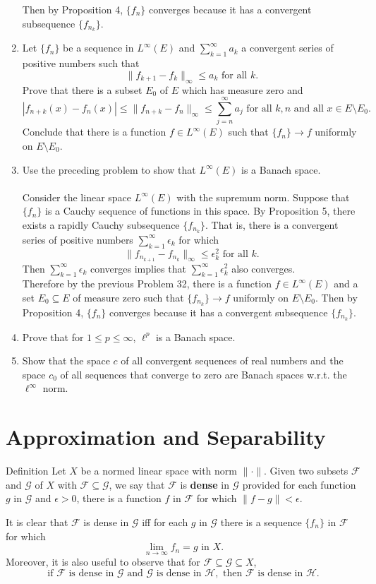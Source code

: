 \begin{enumerate}
	Then by Proposition 4, $\{f_n\}$ converges because it has a convergent subsequence $\{f_{n_k}\}$. 
	\item Let $\{f_n\}$ be a sequence in $L^\infty(E)$ and $\sum_{k=1}^\infty a_k$ a convergent series of positive numbers such that
	\[
		\|f_{k+1}-f_k\|_{\infty}\le a_k\text{ for all }k.
	\]
	Prove that there is a subset $E_0$ of $E$ which has measure zero and 
	\[
		|f_{n+k}(x)-f_n(x)|\le\|f_{n+k}-f_n\|_{\infty}\le\sum_{j=n}^\infty a_j\text{ for all }k,n\text{ and all }x\in E\setminus E_0.
	\]
	Conclude that there is a function $f\in L^\infty(E)$ such that $\{f_n\}\to f$ uniformly on $E\setminus E_0$.
	\item Use the preceding problem to show that $L^\infty(E)$ is a Banach space.\\
	\\Consider the linear space $L^\infty(E)$ with the supremum norm. 
	Suppose that $\{f_n\}$ is a Cauchy sequence of functions in this space.
	By Proposition 5, there exists a rapidly Cauchy subsequence $\{f_{n_k}\}$.
	That is, there is a convergent series of positive numbers $\sum_{k=1}^\infty\epsilon_k$ for which
	\[
		\|f_{n_{k+1}}-f_{n_k}\|_{\infty}\le\epsilon_k^2\text{ for all }k.
	\]
	Then $\sum_{k=1}^\infty\epsilon_k$ converges implies that $\sum_{k=1}^\infty\epsilon_k^2$ also converges.
	\\Therefore by the previous Problem 32, there is a function $f\in L^\infty(E)$ and a set $E_0\subseteq E$ of measure zero such that $\{f_{n_k}\}\to f$ uniformly on $E\setminus E_0$.
	Then by Proposition 4, $\{f_n\}$ converges because it has a convergent subsequence $\{f_{n_k}\}$. 
	\item Prove that for $1\le p\le\infty$, $\ell^p$ is a Banach space.
	\item Show that the space $c$ of all convergent sequences of real numbers and the space $c_0$ of all sequences that converge to zero are Banach spaces w.r.t. the $\ell^\infty$ norm. 
\end{enumerate}

\section{Approximation and Separability}

\begin{namedthm*}{Definition}
	Let $X$ be a normed linear space with norm $\|\cdot\|$.
	Given two subsets $\mathcal{F}$ and $\mathcal{G}$ of $X$ with $\mathcal{F}\subseteq\mathcal{G}$, we say that $\mathcal{F}$ is \textbf{dense} in $\mathcal{G}$ provided for each function $g$ in $\mathcal{G}$ and $\epsilon>0$, there is a function $f$ in $\mathcal{F}$ for which $\|f-g\|<\epsilon$.
\end{namedthm*}
It is clear that $\mathcal{F}$ is dense in $\mathcal{G}$ iff for each $g$ in $\mathcal{G}$ there is a sequence $\{f_n\}$ in $\mathcal{F}$ for which 
\[
	\lim_{n\to\infty}f_n=g\text{ in }X.
\]	
Moreover, it is also useful to observe that for $\mathcal{F}\subseteq\mathcal{G}\subseteq X$,
\[
	\text{if }\mathcal{F}\text{ is dense in }\mathcal{G}\text{ and }\mathcal{G}\text{ is dense in }\mathcal{H},\text{ then }\mathcal{F}\text{ is dense in }\mathcal{H}.
\]

